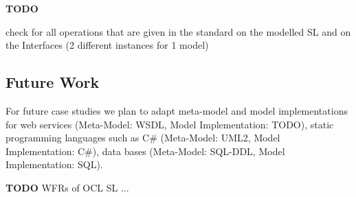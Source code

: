 \textbf{TODO}

check for all operations that are given in the standard on the modelled SL and on the Interfaces (2 different instances for 1 model)


\subsection{Future Work}

For future case studies we plan to adapt meta-model and model implementations for web services (Meta-Model: WSDL, Model Implementation: TODO), static programming languages such as C\# (Meta-Model: UML2, Model Implementation: C\#), data bases (Meta-Model: SQL-DDL, Model Implementation: SQL). 

\textbf{TODO} WFRs of OCL SL ...

